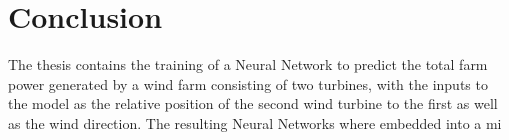 
\chapter{Conclusion}\label{chapter:conclusion}

The thesis contains the training of a Neural Network to predict the total farm power generated by a wind farm consisting of two turbines, with the inputs to the model as the relative position of the second wind turbine to the first as well as the wind direction. The resulting Neural Networks where embedded into a mi